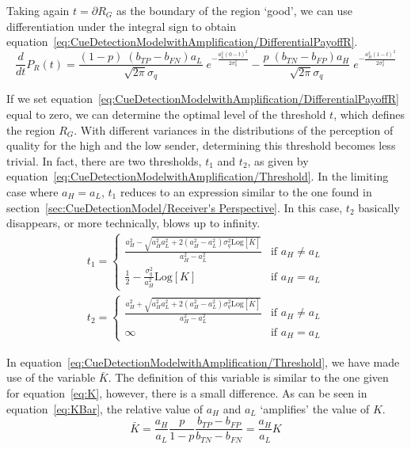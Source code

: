 \documentclass[a4paper,12pt]{article}
\numberwithin{equation}{section}
\begin{document}
Taking again $t=\partial R_{G}$ as the boundary of the region `good', we can use differentiation under the integral sign to obtain equation~\ref{eq:CueDetectionModelwithAmplification/DifferentialPayoffR}.
\begin{equation}
\label{eq:CueDetectionModelwithAmplification/DifferentialPayoffR}
\frac{d}{dt}P_{R}(t)= \frac{(1-p) \; (b_{TP}-b_{FN}) a_{L}}{\sqrt{2 \pi} \sigma_{q}} \; e^{-\frac{a_{L}^{2} (0-t)^2}{2 \sigma_{q}^2}} - \frac{p \; (b_{TN}-b_{FP}) a_{H}}{\sqrt{2 \pi} \sigma_{q}} \; e^{-\frac{a_{H}^{2} (1-t)^2}{2 \sigma_{q}^2}}
\end{equation}

If we set equation~\ref{eq:CueDetectionModelwithAmplification/DifferentialPayoffR} equal to zero, we can determine the optimal level of the threshold $t$, which defines the region $R_{G}$. With different variances in the distributions of the perception of quality for the high and the low sender, determining this threshold becomes less trivial. In fact, there are two thresholds, $t_{1}$ and $t_{2}$, as given by equation~\ref{eq:CueDetectionModelwithAmplification/Threshold}. In the limiting case where $a_{H}=a_{L}$, $t_{1}$ reduces to an expression similar to the one found in section~\ref{sec:CueDetectionModel/Receiver's Perspective}. In this case, $t_{2}$ basically disappears, or more technically, blows up to infinity.
\begin{subequations}
\label{eq:CueDetectionModelwithAmplification/Threshold}
\begin{gather}
t_{1} = \begin{cases}
\displaystyle \frac{a_{H}^{2} - \sqrt{a_{H}^{2} a_{L}^{2} + 2(a_{H}^{2} - a_{L}^{2}) \sigma_{q}^{2} \text{Log}[\bar{K}]}}{a_{H}^{2}-a_{L}^{2}} & \text{if } a_{H} \neq a_{L}\\
\displaystyle \frac{1}{2}-\frac{\sigma_{q}^{2}}{a_{H}^{2}} \text{Log}[K] & \text{if } a_{H} = a_{L}
\end{cases}\\
t_{2}= \begin{cases}
\displaystyle \frac{a_{H}^{2} + \sqrt{a_{H}^{2} a_{L}^{2} + 2(a_{H}^{2} - a_{L}^{2}) \sigma_{q}^{2} \text{Log}[\bar{K}]}}{a_{H}^{2}-a_{L}^{2}} & \text{if } a_{H} \neq a_{L}\\
\infty & \text{if } a_{H} = a_{L}
\end{cases}
\end{gather}
\end{subequations}

In equation~\ref{eq:CueDetectionModelwithAmplification/Threshold}, we have made use of the variable $\bar{K}$. The definition of this variable is similar to the one given for equation~\ref{eq:K}, however, there is a small difference. As can be seen in equation~\ref{eq:KBar}, the relative value of $a_{H}$ and $a_{L}$ `amplifies' the value of $K$.
\begin{equation}
\label{eq:KBar}
\bar{K}=\frac{a_{H}}{a_{L}}\frac{p}{1-p}\frac{b_{TP}-b_{FP}}{b_{TN}-b_{FN}}=\frac{a_{H}}{a_{L}}K
\end{equation}
\end{document}
